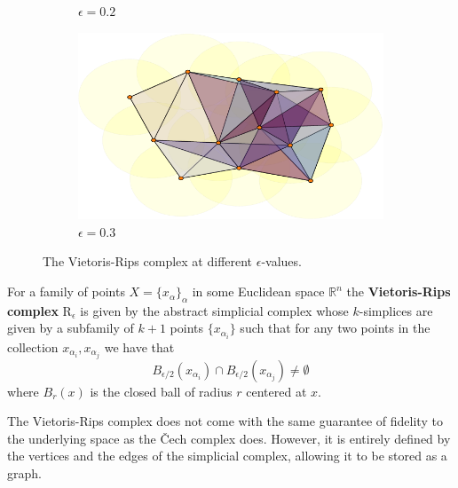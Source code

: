 \begin{figure}
\begin{subfigure}[b]{.49\linewidth}
    \caption{$\epsilon=0.2$}
 \end{subfigure}
  \begin{subfigure}[b]{.5\linewidth}
    \includegraphics[scale=.5]{rips_eps=03.pdf}
    \caption{$\epsilon=0.3$}
 \end{subfigure}
 \caption{The Vietoris-Rips complex at different $\epsilon$-values.}
 \label{manyrips}
\end{figure}

\begin{definition}
For a family of points $X=\{x_{\alpha}\}_{\alpha}$ in some Euclidean space $\mathbb{R}^{n}$ the \textbf{Vietoris-Rips complex}
$\text{R}_{\epsilon}$ is given by the abstract simplicial complex whose $k$-simplices are given by a subfamily of $k+1$ points $\{x_{\alpha_{i}}\}$ such that for any two points in the collection $x_{\alpha_{i}}, x_{\alpha_{j}}$ we have that \[B_{\epsilon/2}(x_{\alpha_{i}}) \cap B_{\epsilon/2}(x_{\alpha_{j}}) \neq \emptyset\] where $B_{r}(x)$ is the closed ball of radius $r$ centered at $x$.
\end{definition}

The Vietoris-Rips complex does not come with the same guarantee of fidelity to the underlying space as the Čech complex does. However, it is entirely defined by the vertices and the edges of the simplicial complex, allowing it to be stored as a graph.

